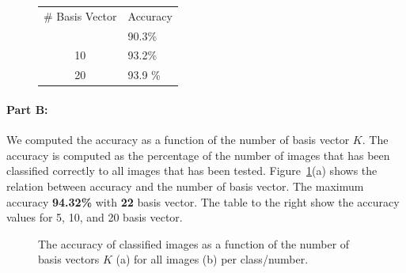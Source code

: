 \vspace{-6.5mm}
\begin{figure}
  \begin{center}
	\begin{tabular}{|c||p{1.6cm}|}
	 \hline
  \# Basis Vector & Accuracy   \\ \hhline{|=|=|}\hline
   5 &90.3\% \\
   \hline
   10 &93.2\% \\
  \hline
   20 & 93.9 \%\\
	\hline
	\end{tabular} 
  \end{center} 
\end{figure}


\paragraph{Part B:}
We computed the accuracy as a function of the number of basis vector $K$. The accuracy is computed as the percentage of the number of images that has been classified correctly to all images that has been tested. Figure~\ref{fig:acc}(a) shows the relation between accuracy and the number of basis vector. The maximum accuracy \textbf{94.32\%} with \textbf{22} basis vector.  The table to the right show the accuracy values for 5, 10, and 20 basis vector. 

\begin{figure}[!tbh]
\centering        
   \caption{The accuracy of classified images as a function of the number of basis vectors $K$ (a) for all images (b) per class/number.}
   \label{fig:acc}
\end{figure}

